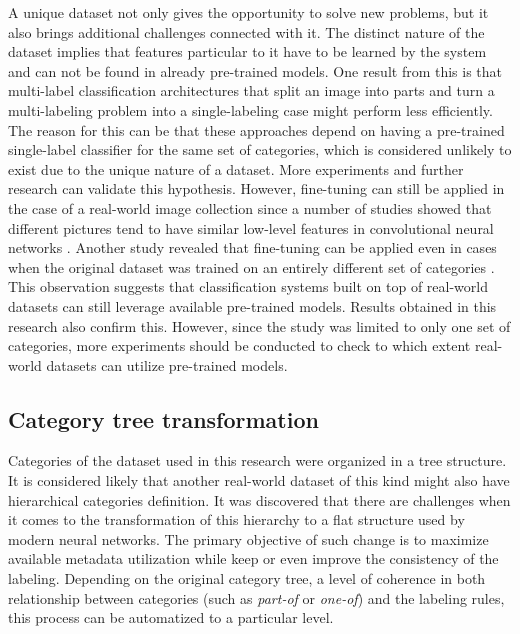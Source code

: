 A unique dataset not only gives the opportunity to solve new problems, but it also brings additional challenges connected with it. The distinct nature of the dataset implies that features particular to it have to be learned by the system and can not be found in already pre-trained models. One result from this is that multi-label classification architectures that split an image into parts and turn a multi-labeling problem into a single-labeling case might perform less efficiently. The reason for this can be that these approaches depend on having a pre-trained single-label classifier for the same set of categories, which is considered unlikely to exist due to the unique nature of a dataset. More experiments and further research can validate this hypothesis. However, fine-tuning can still be applied in the case of a real-world image collection since a number of studies showed that different pictures tend to have similar low-level features in convolutional neural networks \cite{Pan2010TransferLearningSurvey, Oquab2014TransferringMidLevel}. Another study revealed that fine-tuning can be applied even in cases when the original dataset was trained on an entirely different set of categories \cite{Yosinski2014HowTransferable}. This observation suggests that classification systems built on top of real-world datasets can still leverage available pre-trained models. Results obtained in this research also confirm this. However, since the study was limited to only one set of categories, more experiments should be conducted to check to which extent real-world datasets can utilize pre-trained models. 

\subsection{Category tree transformation}
Categories of the dataset used in this research were organized in a tree structure. It is considered likely that another real-world dataset of this kind might also have hierarchical categories definition. It was discovered that there are challenges when it comes to the transformation of this hierarchy to a flat structure used by modern neural networks. The primary objective of such change is to maximize available metadata utilization while keep or even improve the consistency of the labeling. Depending on the original category tree, a level of coherence in both relationship between categories (such as \textit{part-of} or \textit{one-of}) and the labeling rules, this process can be automatized to a particular level.

